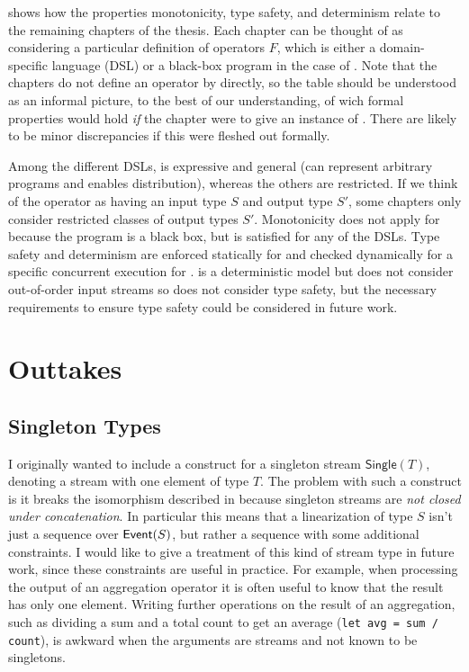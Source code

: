  shows how the properties monotonicity, type safety, and determinism relate to the remaining chapters of the thesis.
Each chapter can be thought of as considering a particular definition of operators $F$, which is either a domain-specific language (DSL) or a black-box program in the case of .
Note that the chapters do not define an operator by  directly, so the table should be understood as an informal picture, to the best of our understanding, of wich formal properties would hold \emph{if} the chapter were to give an instance of . There are likely to be minor discrepancies if this were fleshed out formally.

Among the different DSLs,  is expressive and general (can represent arbitrary programs and enables distribution), whereas the others are restricted.
If we think of the operator as having an input type $S$ and output type $S'$,
some chapters only consider restricted classes of output types $S'$.
Monotonicity does not apply for 
because the program is a black box, but is satisfied for any of the DSLs.
Type safety and determinism are enforced statically for  and checked dynamically for a specific concurrent execution for .
 is a deterministic model but does not consider out-of-order input streams so does not consider type safety, but the necessary
requirements to ensure type safety could be considered in future work.

\section{Outtakes}
\label{sec:types-discussion}

\subsection{Singleton Types}

I originally wanted to include a construct for a singleton stream
$\mathsf{Single}(T)$, denoting a stream with one element of type $T$.
The problem with such a construct is it breaks the isomorphism
described in  because singleton streams are
\emph{not closed under concatenation}.
In particular this means that a linearization of type $S$ isn't just a sequence over $\mathsf{Event}(S)$, but rather a sequence with some additional constraints.
I would like to give a treatment of this kind of stream type in future work, since these constraints are useful in practice.
For example, when processing the output of an aggregation operator it is often useful to know that the result has only one element.
Writing further operations on the result of an aggregation, such as dividing a sum and a total count to get an average (\texttt{let avg = sum / count}), is awkward when the arguments are streams and not known to be singletons.

